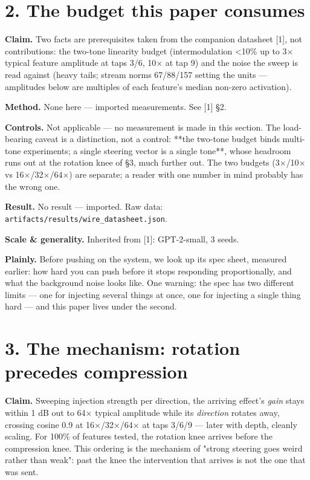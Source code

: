 \documentclass[10pt]{article}
\begin{document}
\section{2. The budget this paper consumes}

\textbf{Claim.} Two facts are prerequisites taken from the companion datasheet [1], not contributions:
the two-tone linearity budget (intermodulation <10\% up to 3$\times$ typical feature amplitude at taps 3/6,
10$\times$ at tap 9) and the noise the sweep is read against (heavy tails; stream norms 67/88/157 setting
the units --- amplitudes below are multiples of each feature's median non-zero activation).

\textbf{Method.} None here --- imported measurements. See [1] §2.

\textbf{Controls.} Not applicable --- no measurement is made in this section. The load-bearing caveat is a
distinction, not a control: **the two-tone budget binds multi-tone experiments; a single steering
vector is a single tone**, whose headroom runs out at the rotation knee of §3, much further out.
The two budgets (3$\times$/10$\times$ vs 16$\times$/32$\times$/64$\times$) are separate; a reader with one number in mind probably has
the wrong one.

\textbf{Result.} No result --- imported. Raw data: \texttt{artifacts/results/wire\_datasheet.json}.

\textbf{Scale \& generality.} Inherited from [1]: GPT-2-small, 3 seeds.

\textbf{Plainly.} Before pushing on the system, we look up its spec sheet, measured earlier: how hard you
can push before it stops responding proportionally, and what the background noise looks like. One
warning: the spec has two different limits --- one for injecting several things at once, one for
injecting a single thing hard --- and this paper lives under the second.

\section{3. The mechanism: rotation precedes compression}

\textbf{Claim.} Sweeping injection strength per direction, the arriving effect's \emph{gain} stays within
1 dB out to 64$\times$ typical amplitude while its \emph{direction} rotates away, crossing cosine 0.9 at
16$\times$/32$\times$/64$\times$ at taps 3/6/9 --- later with depth, cleanly scaling. For 100\% of features tested, the
rotation knee arrives before the compression knee. This ordering is the mechanism of "strong
steering goes weird rather than weak": past the knee the intervention that arrives is not the one
that was sent.
\end{document}
